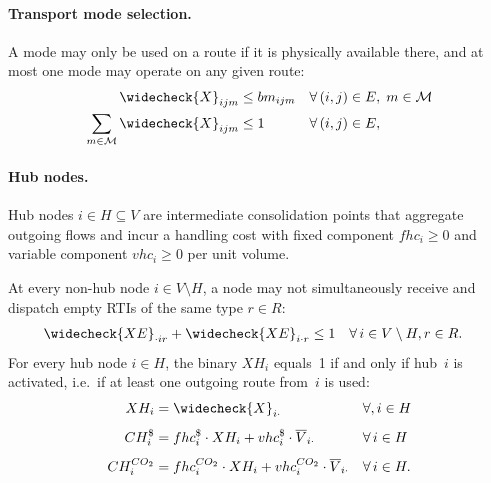 
\paragraph{Transport mode selection.}
A mode may only be used on a route if it is physically available
there, and at most one mode may operate on any given route:
%
\begin{align}
  \widecheck{X}_{ijm}
    &\leq bm_{ijm}
  && \forall\,(i,j)\in E,\;m\in\mathcal{M}
  \label{eq:mode-avail}\\
  \sum_{m\in\mathcal{M}} \widecheck{X}_{ijm}
    &\leq 1
  && \forall\,(i,j)\in E,
  \label{eq:mode-amo}
\end{align}


\paragraph{Hub nodes.}
Hub nodes $i\in H\subseteq V$ are intermediate consolidation points
that aggregate outgoing flows and incur a handling cost with fixed
component $fhc_i\geq 0$ and variable component $vhc_i\geq 0$ per
unit volume.

At every non-hub node $i\in V\setminus H$, a node may not
simultaneously receive and dispatch empty RTIs of the same type $r\in R$:
%
\begin{align}
  \widecheck{XE}_{\cdot ir} + \widecheck{XE}_{i\cdot r}
    &\leq 1
  && \forall\,i\in V\setminus H, r\in R.
  \label{eq:hub-excl}
\end{align}
%
For every hub node $i\in H$, the binary $XH_i$ equals~1 if and
only if hub~$i$ is activated, i.e.\ if at least one outgoing route
from~$i$ is used:
%
\begin{align}
  XH_i &= \widecheck{X}_{i\cdot}
  && \forall,i\in H
  \label{eq:hub-XH}\\[4pt]
  CH^{\$}_i &= fhc^{\$}_i \cdot XH_i + vhc^{\$}_i \cdot \overline{V}_{i\cdot}
  && \forall\,i\in H
  \label{eq:hub-CH-cost}\\[4pt]
  CH^{CO_2}_i &= fhc^{CO_2}_i \cdot XH_i + vhc^{CO_2}_i \cdot \overline{V}_{i\cdot}
  && \forall\,i\in H.
  \label{eq:hub-CH-emissions}
\end{align}

